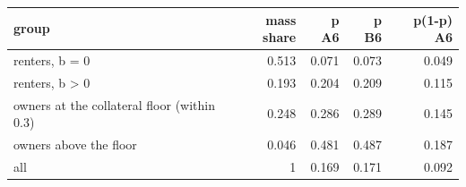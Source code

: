 \begin{tabular}{lrrrr}
\toprule
group & mass share & p A6 & p B6 & p(1-p) A6 \\
\midrule
renters, b = 0 & 0.513 & 0.071 & 0.073 & 0.049 \\
renters, b > 0 & 0.193 & 0.204 & 0.209 & 0.115 \\
owners at the collateral floor (within 0.3) & 0.248 & 0.286 & 0.289 & 0.145 \\
owners above the floor & 0.046 & 0.481 & 0.487 & 0.187 \\
all & 1 & 0.169 & 0.171 & 0.092 \\
\bottomrule
\end{tabular}
